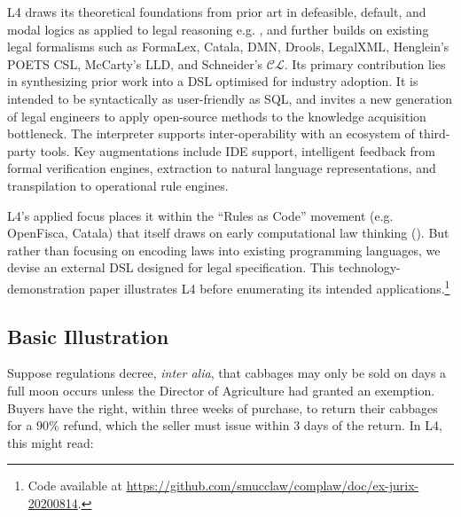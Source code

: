 \documentclass{IOS-Book-Article}
\begin{document}
L4 draws its theoretical foundations from prior art in defeasible, default, and modal logics as applied to legal reasoning e.g. \cite{governatori_variants_2007}, and further builds on existing legal formalisms such as FormaLex\cite{gorin_software_2011}, Catala\cite{merigoux_catala_nodate}, DMN\cite{omg_decision_nodate}, Drools\cite{red_hat_drools_nodate}, LegalXML\cite{athan_legalruleml_2013}, Henglein's POETS CSL\cite{andersen_domain-specific_2014}, McCarty's LLD\cite{mccarty_language_1989}, and Schneider's $\mathcal{CL}$\cite{camilleri_contracts_2017}. Its primary contribution lies in synthesizing prior work into a DSL optimised for industry adoption. It is intended to be syntactically as user-friendly as SQL, and invites a new generation of legal engineers to apply open-source methods to the knowledge acquisition bottleneck. The interpreter supports inter-operability with an ecosystem of third-party tools. Key augmentations include IDE support, intelligent feedback from formal verification engines, extraction to natural language representations, and transpilation to operational rule engines.

L4's applied focus places it within the ``Rules as Code'' movement (e.g. OpenFisca\cite{openfisca_openfisca_nodate}, Catala\cite{merigoux_catala_nodate}) that itself draws on early computational law thinking (\cite{sergot_british_1986, love_computational_2005}). But rather than focusing on encoding laws into existing programming languages, we devise an external DSL designed for legal specification. This technology-demonstration paper illustrates L4 before enumerating its intended applications.\footnote{Code available at \url{https://github.com/smucclaw/complaw/doc/ex-jurix-20200814}.}

\subsection{Basic Illustration}

Suppose regulations decree, \textit{inter alia}, that cabbages may only be sold on days a full moon occurs unless the Director of Agriculture had granted an exemption. Buyers have the right, within three weeks of purchase, to return their cabbages for a 90\% refund, which the seller must issue within 3 days of the return. In L4, this might read:
\end{document}
